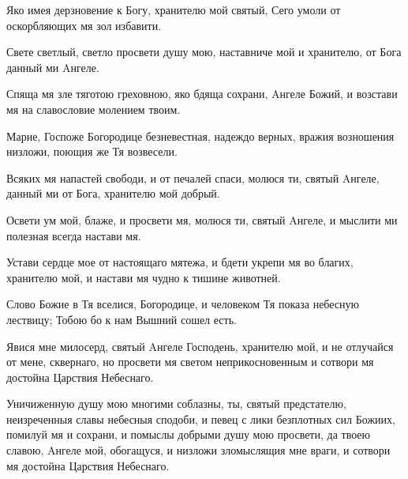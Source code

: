 \begin{mymulticols}


Яко имея дерзновение к Богу, хранителю мой святый, Сего умоли от оскорбляющих мя зол избавити.


Свете светлый, светло просвети душу мою, наставниче мой и хранителю, от Бога данный ми Aнгеле.

\slava

Спяща мя зле тяготою греховною, яко бдяща сохрани, Aнгеле Божий, и возстави мя на славословие молением твоим.

\inyne

Марие, Госпоже Богородице безневестная, надеждо верных, вражия возношения низложи, поющия же Тя возвесели.

\newpage{}



Всяких мя напастей свободи, и от печалей спаси, молюся ти, святый Aнгеле, данный ми от Бога, хранителю мой добрый.


Освети ум мой, блаже, и просвети мя, молюся ти, святый Aнгеле, и мыслити ми полезная всегда настави мя.

\slava

Устави сердце мое от настоящаго мятежа, и бдети укрепи мя во благих, хранителю мой, и настави мя чудно к тишине животней.

\inyne

Слово Божие в Тя вселися, Богородице, и человеком Тя показа небесную лествицу; Тобою бо к нам Вышний сошел есть.


Явися мне милосерд, святый Aнгеле Господень, хранителю мой, и не отлучайся от мене, сквернаго, но просвети мя светом неприкосновенным и сотвори мя достойна Царствия Небеснаго.


Уничиженную душу мою многими соблазны, ты, святый предстателю, неизреченныя славы небесныя сподоби, и певец с лики безплотных сил Божиих, помилуй мя и сохрани, и помыслы добрыми душу мою просвети, да твоею славою, Aнгеле мой, обогащуся, и низложи зломыслящия мне враги, и сотвори мя достойна Царствия Небеснаго.


\end{mymulticols}
